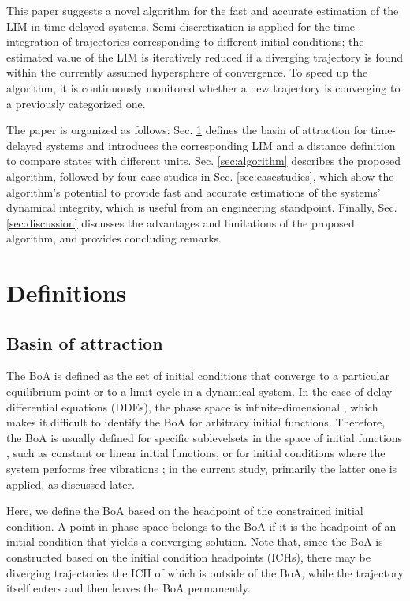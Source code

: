 \documentclass[preprint,12pt]{elsarticle}
\begin{document}
	This paper suggests a novel algorithm for the fast and accurate estimation of the LIM in time delayed systems. Semi-discretization is applied for the time-integration of trajectories corresponding to different initial conditions; the estimated value of the LIM is iteratively reduced if a diverging trajectory is found within the currently assumed
	hypersphere of convergence. To speed up the algorithm, it is 
	continuously monitored whether a new trajectory is converging to a previously categorized one.
	
	The paper is organized as follows: Sec. \ref{sec:definitions} defines the basin of attraction for time-delayed systems and introduces the corresponding LIM and a distance definition to compare states with different units. Sec. \ref{sec:algorithm} describes the proposed algorithm, followed by four case studies in Sec. \ref{sec:casestudies}, which show the algorithm's potential to provide fast and accurate estimations of the systems' dynamical integrity, which is useful from an engineering standpoint. Finally, Sec. \ref{sec:discussion} discusses the advantages and limitations of the proposed algorithm, and provides concluding remarks.
	
	\section{Definitions}\label{sec:definitions}
	\subsection{Basin of attraction}
	
	The BoA is defined as the set of initial conditions that converge to a particular equilibrium point or to a limit cycle in a dynamical system. In the case of delay differential equations (DDEs), the phase space is infinite-dimensional \cite{michiels2007stability}, which makes it difficult to identify the BoA for arbitrary initial functions. Therefore, the BoA is usually defined for specific sublevelsets in the space of initial functions \cite{biemond2014estimation,leng2016basin,yan2021statistical}, such as constant or linear initial functions, or for initial conditions where the system performs free vibrations \cite{yoshida2021basins,scholl2020norm}; in the current study, primarily the latter one is applied, as discussed later. 
	
	Here, we define the BoA based on the headpoint of the constrained initial condition. A point in phase space belongs to the BoA if it is the headpoint of an initial condition that yields a converging solution. Note that, since the BoA is constructed based on the initial condition headpoints (ICHs), there may be diverging trajectories the ICH of which is outside of the BoA, while the trajectory itself enters and then leaves the BoA permanently. 
	
\end{document}
